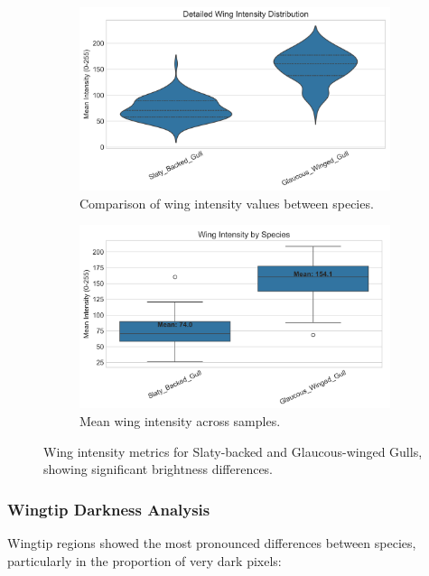 \documentclass[a4paper,12pt]{report}
\begin{document}
\begin{figure}[H]
    \centering
    \begin{subfigure}[b]{0.48\textwidth}
        \centering
        \includegraphics[width=\textwidth]{images/REPORT_IMAGES_INTENSITY/I2/wing_intensity_analysis.png}
        \caption{Comparison of wing intensity values between species.}
        \label{fig:wing_intensity}
    \end{subfigure}
    \hfill
    \begin{subfigure}[b]{0.48\textwidth}
        \centering
        \includegraphics[width=\textwidth]{images/REPORT_IMAGES_INTENSITY/I2/WINGINTENSITY.png}
        \caption{Mean wing intensity across samples.}
        \label{fig:wing_intensity_means}
    \end{subfigure}
    \caption{Wing intensity metrics for Slaty-backed and Glaucous-winged Gulls, showing significant brightness differences.}
    \label{fig:wing_intensity_combined}
\end{figure}


\subsubsection{Wingtip Darkness Analysis}
Wingtip regions showed the most pronounced differences between species, particularly in the proportion of very dark pixels:
\end{document}
